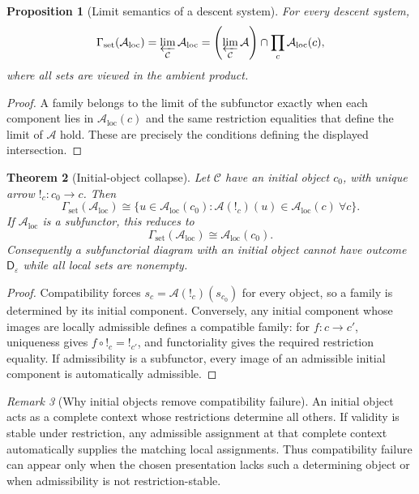 \documentclass[11pt]{article}
\theoremstyle{plain}
\newtheorem{theorem}{Theorem}[section]
\newtheorem{proposition}[theorem]{Proposition}
\theoremstyle{definition}
\theoremstyle{remark}
\newtheorem{remark}[theorem]{Remark}
\newcommand{\LocalAdm}{\mathcal{A}_{\mathrm{loc}}}
\newcommand{\eps}{\varepsilon}
\begin{document}
\begin{proposition}[Limit semantics of a descent system]\label{prop:limit-semantics}
For every descent system,
\[
\Gamma_{\mathrm{set}}(\LocalAdm)
=\varprojlim_{\mathcal C}\LocalAdm
=\left(\varprojlim_{\mathcal C}\mathcal A\right)
\cap\prod_c\LocalAdm(c),
\]
where all sets are viewed in the ambient product.
\end{proposition}

\begin{proof}
A family belongs to the limit of the subfunctor exactly when each component lies
in $\LocalAdm(c)$ and the same restriction equalities that define the limit of
$\mathcal A$ hold. These are precisely the conditions defining the displayed
intersection.
\end{proof}

\begin{theorem}[Initial-object collapse]\label{thm:initial-collapse}
Let $\mathcal C$ have an initial object $c_0$, with unique arrow
$!_c:c_0\to c$. Then
\[
\Gamma_{\mathrm{set}}(\LocalAdm)
\cong
\{u\in\LocalAdm(c_0):
\mathcal A(!_c)(u)\in\LocalAdm(c)\ \forall c\}.
\]
If $\LocalAdm$ is a subfunctor, this reduces to
\[
\Gamma_{\mathrm{set}}(\LocalAdm)\cong\LocalAdm(c_0).
\]
Consequently a subfunctorial diagram with an initial object cannot have outcome
$\mathsf D_\eps$ while all local sets are nonempty.
\end{theorem}

\begin{proof}
Compatibility forces $s_c=\mathcal A(!_c)(s_{c_0})$ for every object, so a
family is determined by its initial component. Conversely, any initial component
whose images are locally admissible defines a compatible family: for
$f:c\to c'$, uniqueness gives $f\circ !_c=!_{c'}$, and functoriality gives the
required restriction equality. If admissibility is a subfunctor, every image of
an admissible initial component is automatically admissible.
\end{proof}

\begin{remark}[Why initial objects remove compatibility failure]
An initial object acts as a complete context whose restrictions determine all
others. If validity is stable under restriction, any admissible assignment at
that complete context automatically supplies the matching local assignments.
Thus compatibility failure can appear only when the chosen presentation lacks
such a determining object or when admissibility is not restriction-stable.
\end{remark}
\end{document}
